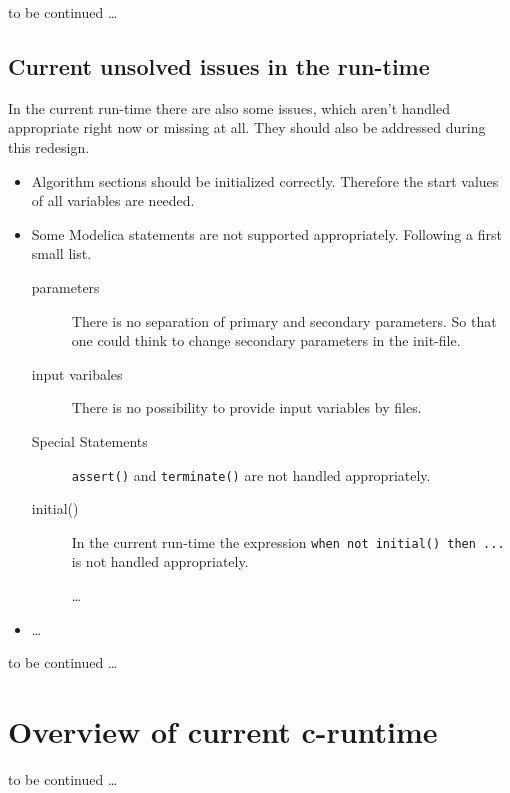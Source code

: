 to be continued \ldots

\subsection{Current unsolved issues in the run-time}\label{sec:currentsbugs}

In the current run-time there are also some issues, which aren't handled
appropriate right now or missing at all. They should also be addressed during
this redesign.
\begin{itemize}
  \item Algorithm sections should be initialized correctly. Therefore the start
  values of all variables are needed.
  \item Some Modelica statements are not supported appropriately.
  Following a first small list.
  \begin{description}
     \item[parameters] There is no separation of primary and secondary
     parameters. So that one could think to change secondary parameters in
     the init-file.
     \item[input varibales] There is no possibility to provide input variables
     by files.
     \item[Special Statements] \lstinline{assert()} and \lstinline{terminate()} are not handled
     appropriately. \\
     \item[initial()] In the current run-time the expression 
     \lstinline{when not initial() then ... } is not handled appropriately.
     \item[] \ldots
   \end{description} 
   \item \ldots
\end{itemize} 

to be continued \ldots

\section{Overview of current c-runtime}

to be continued \ldots


